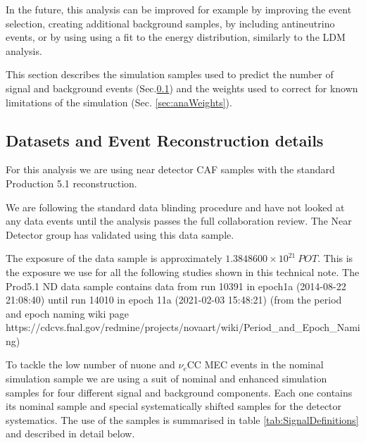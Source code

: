 In the future, this analysis can be improved for example by improving the event selection, creating additional background samples, by including antineutrino events, or by using using a fit to the energy distribution, similarly to the \gls{LDM} analysis.

This section describes the simulation samples used to predict the number of signal and background events (Sec.\ref{sec:datasets}) and the weights used to correct for known limitations of the simulation (Sec. \ref{sec:anaWeights}).


\subsection{Datasets and Event Reconstruction details}\label{sec:datasets}
For this analysis we are using near detector CAF samples with the standard Production 5.1 reconstruction.

We are following the standard data blinding procedure and have not looked at any data events until the analysis passes the full collaboration review. The Near Detector group has validated  using this data sample.

The exposure of the data sample is approximately $1.3848600\times 10^{21}\ \unit{POT}$. This is the exposure we use for all the following studies shown in this technical note.
The Prod5.1 ND data sample contains data from run 10391 in epoch1a (2014-08-22 21:08:40) until run 14010 in epoch 11a (2021-02-03 15:48:21) (from the period and epoch naming wiki page https://cdcvs.fnal.gov/redmine/projects/novaart/wiki/Period\_and\_Epoch\_Naming)

To tackle the low number of \gls{nuone} and $\nu_e$\gls{CC} \gls{MEC} events in the nominal simulation sample we are using a suit of nominal and enhanced simulation samples for four different signal and background components. Each one contains its nominal sample and special systematically shifted samples for the detector systematics. The use of the samples is summarised in table \ref{tab:SignalDefinitions} and described in detail below.

